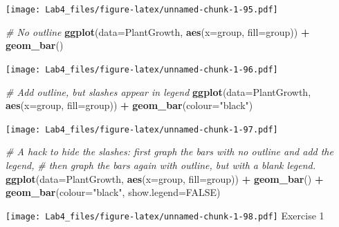 \documentclass[]{article}
\newenvironment{Shaded}{\begin{snugshade}}{\end{snugshade}}
\newcommand{\KeywordTok}[1]{\textcolor[rgb]{0.13,0.29,0.53}{\textbf{#1}}}
\newcommand{\DataTypeTok}[1]{\textcolor[rgb]{0.13,0.29,0.53}{#1}}
\newcommand{\StringTok}[1]{\textcolor[rgb]{0.31,0.60,0.02}{#1}}
\newcommand{\CommentTok}[1]{\textcolor[rgb]{0.56,0.35,0.01}{\textit{#1}}}
\newcommand{\OtherTok}[1]{\textcolor[rgb]{0.56,0.35,0.01}{#1}}
\newcommand{\OperatorTok}[1]{\textcolor[rgb]{0.81,0.36,0.00}{\textbf{#1}}}
\newcommand{\NormalTok}[1]{#1}
\begin{document}
\texttt{[image: Lab4\_files/figure-latex/unnamed-chunk-1-95.pdf]}

\begin{Shaded}
\begin{Highlighting}[]
\CommentTok{# No outline}
\KeywordTok{ggplot}\NormalTok{(}\DataTypeTok{data=}\NormalTok{PlantGrowth, }\KeywordTok{aes}\NormalTok{(}\DataTypeTok{x=}\NormalTok{group, }\DataTypeTok{fill=}\NormalTok{group)) }\OperatorTok{+}
\StringTok{    }\KeywordTok{geom_bar}\NormalTok{()}
\end{Highlighting}
\end{Shaded}

\texttt{[image: Lab4\_files/figure-latex/unnamed-chunk-1-96.pdf]}

\begin{Shaded}
\begin{Highlighting}[]
\CommentTok{# Add outline, but slashes appear in legend}
\KeywordTok{ggplot}\NormalTok{(}\DataTypeTok{data=}\NormalTok{PlantGrowth, }\KeywordTok{aes}\NormalTok{(}\DataTypeTok{x=}\NormalTok{group, }\DataTypeTok{fill=}\NormalTok{group)) }\OperatorTok{+}
\StringTok{    }\KeywordTok{geom_bar}\NormalTok{(}\DataTypeTok{colour=}\StringTok{"black"}\NormalTok{)}
\end{Highlighting}
\end{Shaded}

\texttt{[image: Lab4\_files/figure-latex/unnamed-chunk-1-97.pdf]}

\begin{Shaded}
\begin{Highlighting}[]
\CommentTok{# A hack to hide the slashes: first graph the bars with no outline and add the legend,}
\CommentTok{# then graph the bars again with outline, but with a blank legend.}
\KeywordTok{ggplot}\NormalTok{(}\DataTypeTok{data=}\NormalTok{PlantGrowth, }\KeywordTok{aes}\NormalTok{(}\DataTypeTok{x=}\NormalTok{group, }\DataTypeTok{fill=}\NormalTok{group)) }\OperatorTok{+}
\StringTok{    }\KeywordTok{geom_bar}\NormalTok{() }\OperatorTok{+}
\StringTok{    }\KeywordTok{geom_bar}\NormalTok{(}\DataTypeTok{colour=}\StringTok{"black"}\NormalTok{, }\DataTypeTok{show.legend=}\OtherTok{FALSE}\NormalTok{)}
\end{Highlighting}
\end{Shaded}

\texttt{[image: Lab4\_files/figure-latex/unnamed-chunk-1-98.pdf]}
Exercise 1
\end{document}
